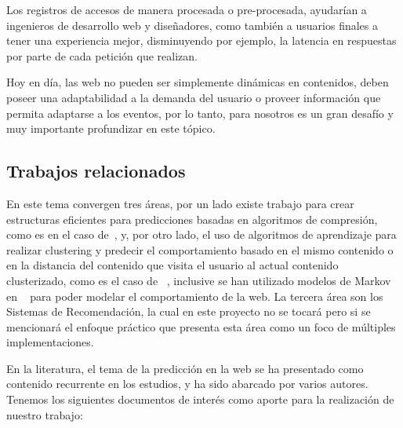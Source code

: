   Los registros de accesos de manera procesada o pre-procesada, ayudarían a ingenieros de desarrollo web y diseñadores, como también a usuarios finales a tener una experiencia  mejor, disminuyendo por ejemplo, la latencia en respuestas por parte de cada petición que realizan.
  
  Hoy en día, las web no pueden ser simplemente dinámicas en contenidos, deben poseer una adaptabilidad a la demanda del usuario o proveer información que permita adaptarse a los eventos, por lo tanto, para nosotros es un gran desafío y muy importante  profundizar en este tópico.




  \subsection{Trabajos relacionados}



En este tema convergen tres áreas, por un lado existe trabajo para crear estructuras eficientes para predicciones basadas en algoritmos de compresión, como es en el caso de~\cite{Claude2014}, y, por otro lado, el uso de algoritmos de aprendizaje para realizar clustering y predecir el comportamiento basado en el mismo contenido o en la distancia del contenido que visita el usuario al actual contenido clusterizado, como es el caso de ~\cite{Poornalatha2012}, inclusive se han utilizado modelos de Markov en ~\cite{Dongshan2002}  para poder modelar el comportamiento de la web.
La tercera área son los Sistemas de Recomendación, la cual en este proyecto no se tocará pero si se mencionará el enfoque práctico que presenta esta área como un foco de múltiples implementaciones. 


En la literatura, el tema de la predicción en la web se ha presentado como contenido recurrente en los estudios, y ha sido abarcado por varios autores. Tenemos los siguientes documentos de interés como aporte para la realización de nuestro trabajo:

